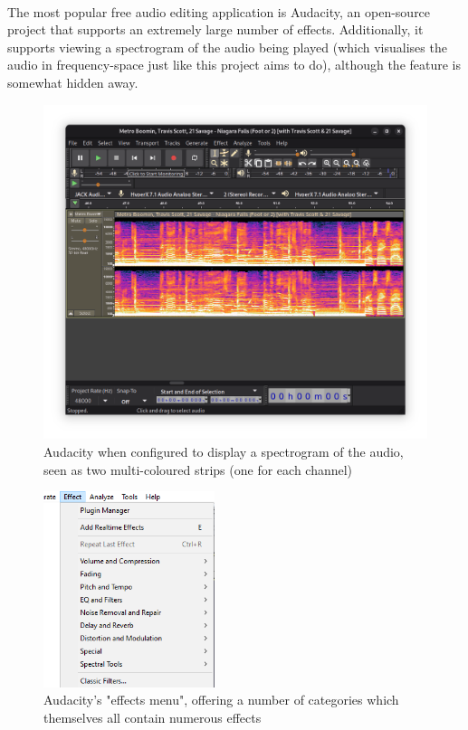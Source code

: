 \paragraph{}
The most popular free audio editing application is Audacity, an open-source project that supports an extremely large number of effects. Additionally, it supports viewing a spectrogram of the audio being played (which visualises the audio in frequency-space just like this project aims to do), although the feature is somewhat hidden away.

\begin{figure}[H]
	\caption{Audacity when configured to display a spectrogram of the audio, seen as two multi-coloured strips (one for each channel)}
	\begin{center}
		\includegraphics[width=15cm]{./audacity spectogram.png}
	\end{center}
\end{figure}

\begin{figure}[H]
	\caption{Audacity's "effects menu", offering a number of categories which themselves all contain numerous effects}
	\begin{center}
		\includegraphics[width=5cm]{./audacity effects menu.png}
	\end{center}
\end{figure}

